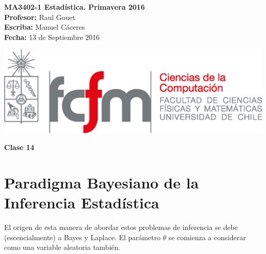 \documentclass[10pt]{article}
\theoremstyle{plain}
\theoremstyle{definition}
\newcommand{\catnum}{14} %
\newcommand{\fecha}{13 de Septiembre 2016 }
\begin{document}
\vspace*{-1.2 cm}
\begin{minipage}{0.6\textwidth}
\begin{flushleft}
\hspace*{-0.5cm}\textbf{MA3402-1 Estadística. Primavera 2016}\\
\hspace*{-0.5cm}\textbf{Profesor:} Raul Gouet\\
\hspace*{-0.5cm}\textbf{Escriba:} Manuel Cáceres\\
\hspace*{-0.5cm}\textbf{Fecha:} \fecha
\end{flushleft}
\end{minipage}
\begin{minipage}{0.36\textwidth}
\begin{flushright}
\includegraphics[scale=0.3]{imagenes/fcfm_dcc}
\end{flushright}
\end{minipage}
\bigskip

\begin{center}
\LARGE\textbf{Clase \catnum}
\end{center}
\section{Paradigma Bayesiano de la Inferencia Estadística}
El origen de esta manera de abordar estos problemas de inferencia se debe (escencialmente) a Bayes y Laplace. El parámetro $\theta$ se comienza a considerar como una variable aleatoria también.
\end{document}
